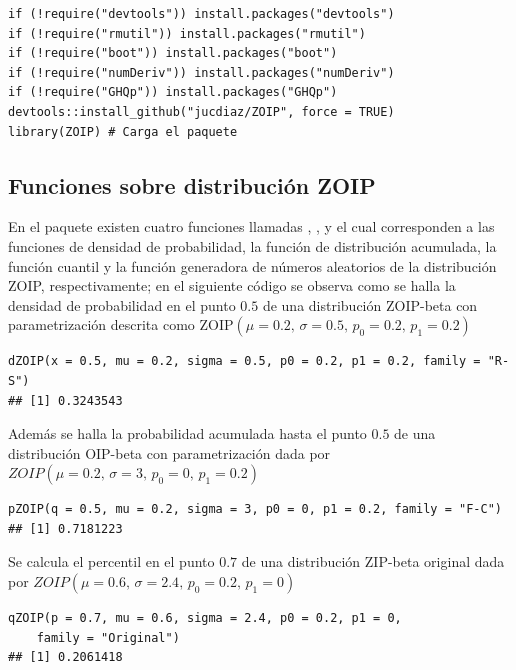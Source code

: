 \begin{verbatim}
if (!require("devtools")) install.packages("devtools")
if (!require("rmutil")) install.packages("rmutil")
if (!require("boot")) install.packages("boot")
if (!require("numDeriv")) install.packages("numDeriv")
if (!require("GHQp")) install.packages("GHQp")
devtools::install_github("jucdiaz/ZOIP", force = TRUE)
library(ZOIP) # Carga el paquete
\end{verbatim}

\subsection{Funciones sobre distribuci\'{o}n ZOIP}

En el paquete  existen cuatro funciones llamadas , ,  y  el cual corresponden a las funciones de densidad de probabilidad, la funci\'{o}n de distribuci\'{o}n acumulada, la funci\'{o}n cuantil y la funci\'{o}n generadora de n\'{u}meros aleatorios de la distribuci\'{o}n ZOIP, respectivamente; en el siguiente c\'{o}digo se observa como se halla la densidad de probabilidad en el punto $0.5$ de una distribuci\'{o}n ZOIP-beta con parametrizaci\'{o}n \cite{Stasinopoulos2} descrita como $\text{ZOIP}(\mu=0.2, \, \sigma=0.5, \, p_0=0.2, \, p_1=0.2)$\\

\begin{verbatim}
dZOIP(x = 0.5, mu = 0.2, sigma = 0.5, p0 = 0.2, p1 = 0.2, family = "R-S")
## [1] 0.3243543
\end{verbatim}

Adem\'{a}s se halla la probabilidad acumulada hasta el punto $0.5$ de una distribuci\'{o}n OIP-beta con parametrizaci\'{o}n \cite{Ferrari2} dada por $ZOIP(\mu=0.2, \, \sigma=3, \, p_0=0, \, p_1=0.2)$\\

\begin{verbatim}
pZOIP(q = 0.5, mu = 0.2, sigma = 3, p0 = 0, p1 = 0.2, family = "F-C")
## [1] 0.7181223
\end{verbatim}

Se calcula el percentil en el punto $0.7$ de una distribuci\'{o}n ZIP-beta original dada por $ZOIP(\mu=0.6, \, \sigma=2.4, \, p_0=0.2, \, p_1=0)$\\

\begin{verbatim}
qZOIP(p = 0.7, mu = 0.6, sigma = 2.4, p0 = 0.2, p1 = 0, 
    family = "Original")
## [1] 0.2061418
\end{verbatim}

